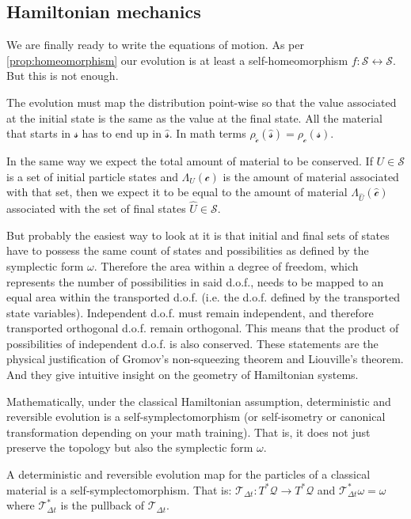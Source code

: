 \documentclass[smallextended]{svjour3}
\numberwithin{equation}{section}
\begin{document}
\subsection{Hamiltonian mechanics}

We are finally ready to write the equations of motion. As per \ref{prop:homeomorphism} our evolution is at least a self-homeomorphism $f:\mathcal{S} \leftrightarrow \mathcal{S}$. But this is not enough.

The evolution must map the distribution point-wise so that the value associated at the initial state is the same as the value at the final state. All the material that starts in $\mathcal{s}$ has to end up in $\hat{\mathcal{s}}$. In math terms $\rho_{\hat{\mathcal{c}}} (\hat{\mathcal{s}}) = \rho_\mathcal{c}(\mathcal{s})$.

In the same way we expect the total amount of material to be conserved. If $U \in \mathcal{S}$ is a set of initial particle states and $\Lambda_U(\mathcal{c})$ is the amount of material associated with that set, then we expect it to be equal to the amount of material $\Lambda_{\hat{U}}(\hat{\mathcal{c}})$ associated with the set of final states $\hat{U} \in \mathcal{S}$.

But probably the easiest way to look at it is that initial and final sets of states have to possess the same count of states and possibilities as defined by the symplectic form $\omega$. Therefore the area within a degree of freedom, which represents the number of possibilities in said d.o.f., needs to be mapped to an equal area within the transported d.o.f. (i.e. the d.o.f. defined by the transported state variables). Independent d.o.f. must remain independent, and therefore transported orthogonal d.o.f. remain orthogonal. This means that the product of possibilities of independent d.o.f. is also conserved. These statements are the physical justification of Gromov's non-squeezing theorem \cite{Gromov,deGosson,Stewart} and Liouville's theorem. And they give intuitive insight on the geometry of Hamiltonian systems.

Mathematically, under the classical Hamiltonian assumption,  deterministic and reversible evolution is a self-symplectomorphism (or self-isometry or canonical transformation depending on your math training). That is, it does not just preserve the topology but also the symplectic form $\omega$.

\begin{prop}\label{prop:symplectomorphism}
	A deterministic and reversible evolution map for the particles of a classical material is a self-symplectomorphism. That is: $\mathcal{T}_{\Delta t}: T^*\mathcal{Q} \rightarrow T^*\mathcal{Q}$ and $\mathcal{T}_{\Delta t}^*\omega = \omega$ where $\mathcal{T}_{\Delta t}^*$ is the pullback of $\mathcal{T}_{\Delta t}$.
\end{prop}
\end{document}
